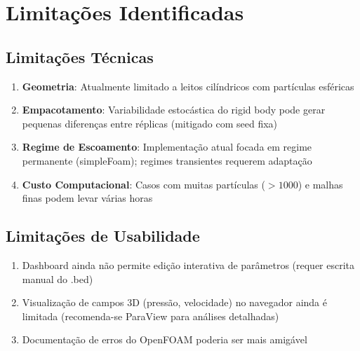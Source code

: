 \section{Limitações Identificadas}

\subsection{Limitações Técnicas}

\begin{enumerate}
    \item \textbf{Geometria}: Atualmente limitado a leitos cilíndricos com partículas esféricas
    
    \item \textbf{Empacotamento}: Variabilidade estocástica do rigid body pode gerar pequenas diferenças entre réplicas (mitigado com seed fixa)
    
    \item \textbf{Regime de Escoamento}: Implementação atual focada em regime permanente (simpleFoam); regimes transientes requerem adaptação
    
    \item \textbf{Custo Computacional}: Casos com muitas partículas ($> 1000$) e malhas finas podem levar várias horas
\end{enumerate}

\subsection{Limitações de Usabilidade}

\begin{enumerate}
    \item Dashboard ainda não permite edição interativa de parâmetros (requer escrita manual do .bed)
    
    \item Visualização de campos 3D (pressão, velocidade) no navegador ainda é limitada (recomenda-se ParaView para análises detalhadas)
    
    \item Documentação de erros do OpenFOAM poderia ser mais amigável
\end{enumerate}

